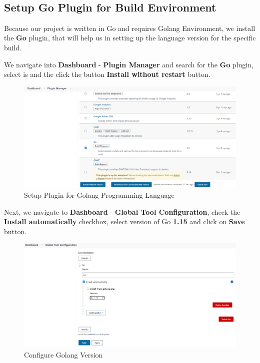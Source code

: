 \documentclass[12pt,a4paper,twoside]{article}
\begin{document}
~\newpage


\subsection{Setup Go Plugin for Build Environment}


Because our project is written in Go and requires Golang Environment, we install the \textbf{Go} plugin, that will help us in setting up the language version for the specific build.

We navigate into \textbf{Dashboard} - \textbf{Plugin Manager} and search for the \textbf{Go} plugin, select is and the click the button \textbf{Install without restart} button.


\begin{figure}[h!]
    \centering
        \includegraphics[width=15cm]{images-aws/30-go-plugin.png}
        \caption{Setup Plugin for Golang Programming Language}
\end{figure}


Next, we navigate to \textbf{Dashboard} - \textbf{Global Tool Configuration}, check the \textbf{Install automatically} checkbox, select version of Go \textbf{1.15} and click on \textbf{Save} button.


\begin{figure}[h!]
    \centering
        \includegraphics[width=15cm]{images-aws/31-go-global-tool.png}
        \caption{Configure Golang Version}
\end{figure}
\end{document}
